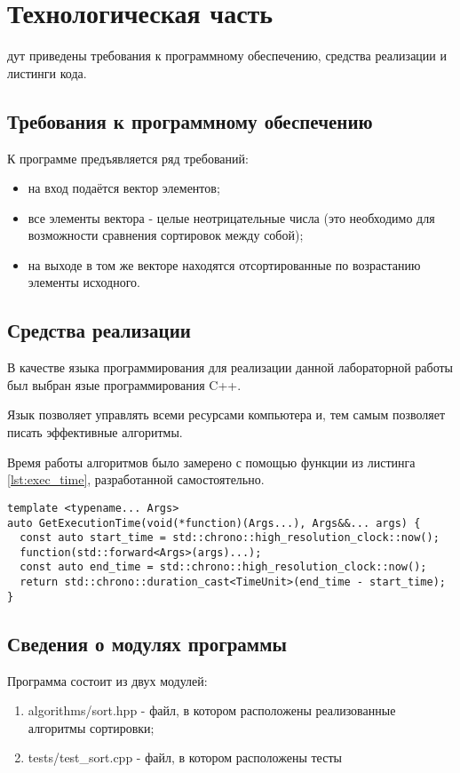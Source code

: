 \chapter{Технологическая часть}

дут приведены требования к программному обеспечению, средства реализации и листинги кода.

\section{Требования к программному обеспечению}

К программе предъявляется ряд требований:
\begin{itemize}
    \item на вход подаётся вектор элементов;
    \item все элементы вектора - целые неотрицательные числа (это необходимо для возможности сравнения сортировок между собой);
    \item на выходе в том же векторе находятся отсортированные по возрастанию элементы исходного.
\end{itemize}

\section{Средства реализации}

В качестве языка программирования для реализации данной лабораторной работы был выбран язые программирования C++\cite{pythonlang}.

Язык позволяет управлять всеми ресурсами компьютера и, тем самым позволяет
писать эффективные алгоритмы.

Время работы алгоритмов было замерено с помощью функции из листинга \ref{lst:exec_time}, разработанной самостоятельно.
\begin{lstlisting}[label=lst:exec_time, caption=Функция для замера времени исполнения процедуры]
template <typename... Args>
auto GetExecutionTime(void(*function)(Args...), Args&&... args) {
  const auto start_time = std::chrono::high_resolution_clock::now();
  function(std::forward<Args>(args)...);
  const auto end_time = std::chrono::high_resolution_clock::now();
  return std::chrono::duration_cast<TimeUnit>(end_time - start_time);
}
\end{lstlisting}

\section{Сведения о модулях программы}
Программа состоит из двух модулей:
\begin{enumerate}
    \item algorithms/sort.hpp - файл, в котором расположены реализованные алгоритмы сортировки;
    \item tests/test\_sort.cpp - файл, в котором расположены тесты
\end{enumerate}


